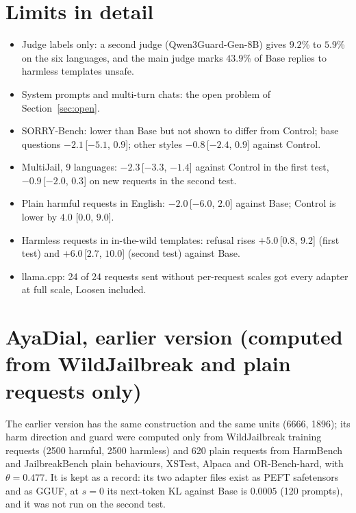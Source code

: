 \documentclass[10pt,a4paper]{article}
\begin{document}
\section{Limits in detail}
\begin{itemize}\setlength{\itemsep}{1pt}
\item Judge labels only: a second judge (Qwen3Guard-Gen-8B) gives $9.2$\% to $5.9$\% on the six languages, and the main judge marks $43.9$\% of Base replies to harmless templates unsafe.
\item System prompts and multi-turn chats: the open problem of Section~\ref{sec:open}.
\item SORRY-Bench: lower than Base but not shown to differ from Control; base questions $-2.1$\,[$-5.1$, $0.9$]; other styles $-0.8$\,[$-2.4$, $0.9$] against Control.
\item MultiJail, 9 languages: $-2.3$\,[$-3.3$, $-1.4$] against Control in the first test, $-0.9$\,[$-2.0$, $0.3$] on new requests in the second test.
\item Plain harmful requests in English: $-2.0$\,[$-6.0$, $2.0$] against Base; Control is lower by $4.0$ [$0.0$, $9.0$].
\item Harmless requests in in-the-wild templates: refusal rises $+5.0$\,[$0.8$, $9.2$] (first test) and $+6.0$\,[$2.7$, $10.0$] (second test) against Base.
\item llama.cpp: 24 of 24 requests sent without per-request scales got every adapter at full scale, Loosen included.
\end{itemize}
\section{AyaDial, earlier version (computed from WildJailbreak and plain requests only)}\label{app:earlier}
The earlier version has the same construction and the same units (6666, 1896); its harm direction and guard were computed only from WildJailbreak training requests (2500 harmful, 2500 harmless) and 620 plain requests from HarmBench and JailbreakBench plain behaviours, XSTest, Alpaca and OR-Bench-hard, with $\theta = 0.477$. It is kept as a record: its two adapter files exist as PEFT safetensors and as GGUF, at $s = 0$ its next-token KL against Base is $0.0005$ (120 prompts), and it was not run on the second test.
\end{document}
